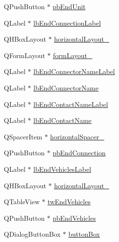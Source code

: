 \begin{DoxyCompactItemize}
Q\-Push\-Button $\ast$ \hyperlink{class_ui__mdt_cl_unit_link_dialog_a1f610d4a794903cc1a90a1a9881a5d0b}{pb\-End\-Unit}
\item 
Q\-Label $\ast$ \hyperlink{class_ui__mdt_cl_unit_link_dialog_aa099f7301abc6dfd2985dac22e5ff4de}{lb\-End\-Connection\-Label}
\item 
Q\-H\-Box\-Layout $\ast$ \hyperlink{class_ui__mdt_cl_unit_link_dialog_a5dc8658ee13e78ddf394d0751acb8e92}{horizontal\-Layout\-\_}
\item 
Q\-Form\-Layout $\ast$ \hyperlink{class_ui__mdt_cl_unit_link_dialog_a5aab941e8762c827b8633931d145990c}{form\-Layout\-\_}
\item 
Q\-Label $\ast$ \hyperlink{class_ui__mdt_cl_unit_link_dialog_a4b95be3f2e905844739ad3cf59106378}{lb\-End\-Connector\-Name\-Label}
\item 
Q\-Label $\ast$ \hyperlink{class_ui__mdt_cl_unit_link_dialog_aa0d04d3f41a73baa6422f705aa1ca317}{lb\-End\-Connector\-Name}
\item 
Q\-Label $\ast$ \hyperlink{class_ui__mdt_cl_unit_link_dialog_ae6cabdba3d4f552beb2aa8c8690ef2b5}{lb\-End\-Contact\-Name\-Label}
\item 
Q\-Label $\ast$ \hyperlink{class_ui__mdt_cl_unit_link_dialog_ab4eef76ab71b7baf7700a88e75ad50f9}{lb\-End\-Contact\-Name}
\item 
Q\-Spacer\-Item $\ast$ \hyperlink{class_ui__mdt_cl_unit_link_dialog_a5b6f6167f448ff6f5244fc361a2929ca}{horizontal\-Spacer\-\_}
\item 
Q\-Push\-Button $\ast$ \hyperlink{class_ui__mdt_cl_unit_link_dialog_acb5b15bd5a4135365b40c077fc0716cf}{pb\-End\-Connection}
\item 
Q\-Label $\ast$ \hyperlink{class_ui__mdt_cl_unit_link_dialog_a4e3ea4e5df79bc7ff4cdef38eb047c14}{lb\-End\-Vehicles\-Label}
\item 
Q\-H\-Box\-Layout $\ast$ \hyperlink{class_ui__mdt_cl_unit_link_dialog_a167f00166284577a6a90fcfd432e1916}{horizontal\-Layout\-\_}
\item 
Q\-Table\-View $\ast$ \hyperlink{class_ui__mdt_cl_unit_link_dialog_ae2fed2def3422e176f545e0fb02985bf}{tw\-End\-Vehicles}
\item 
Q\-Push\-Button $\ast$ \hyperlink{class_ui__mdt_cl_unit_link_dialog_a26d99c0c35027e17c59c764d89d67ed0}{pb\-End\-Vehicles}
\item 
Q\-Dialog\-Button\-Box $\ast$ \hyperlink{class_ui__mdt_cl_unit_link_dialog_ae62ee85f0f4de408f30ae14ce0044fd1}{button\-Box}
\end{DoxyCompactItemize}


